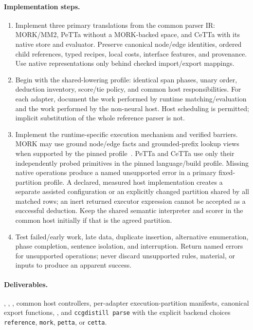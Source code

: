 \documentclass[11pt,a4paper]{article}
\begin{document}
\paragraph{Implementation steps.}
\begin{enumerate}
\item Implement three primary translations from the common parser IR:
MORK/MM2, PeTTa without a MORK-backed space, and CeTTa with its native store
and evaluator. Preserve
canonical node/edge identities, ordered child references, typed recipes,
local costs, interface features, and provenance. Use native representations
only behind checked import/export mappings.
\item Begin with the shared-lowering profile: identical span phases, unary
order, deduction inventory, score/tie policy, and common host responsibilities.
For each adapter, document the work performed by runtime matching/evaluation
and the work performed by the non-neural host. Host scheduling is permitted;
implicit substitution of the whole reference parser is not.
\item Implement the runtime-specific execution mechanism and verified
barriers. MORK may use ground node/edge facts and grounded-prefix lookup views
when supported by the pinned profile~\cite{morkdata}. PeTTa and CeTTa use only
their independently probed primitives in the pinned language/build profile.
Missing native operations produce a named unsupported error in a primary
fixed-partition profile. A declared, measured host implementation creates a
separate assisted configuration or an explicitly changed partition shared by
all matched rows; an inert returned executor
expression cannot be accepted as a successful deduction. Keep the shared semantic interpreter
and scorer in the common host initially if that is the agreed partition.
\item Test failed/early work, late data, duplicate insertion, alternative
enumeration, phase completion, sentence isolation, and interruption. Return
named errors for unsupported operations; never discard unsupported rules,
material, or inputs to produce an apparent success.
\end{enumerate}

\paragraph{Deliverables.} ,
, , common host controllers,
per-adapter execution-partition manifests, canonical export functions,
, and \texttt{ccgdistill parse} with the explicit
backend choices \texttt{reference}, \texttt{mork}, \texttt{petta}, or
\texttt{cetta}.
\end{document}
